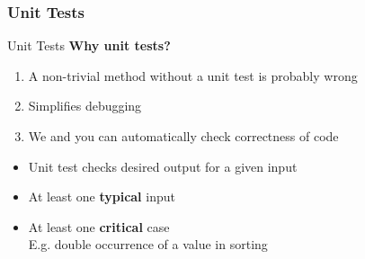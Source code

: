 \subsubsection{Unit Tests}
\begin{frame}{Unit Tests}
  \textbf{Why unit tests?}
  \begin{enumerate}
    \item
      A non-trivial method without a unit test is probably wrong
    \item<2- |handout:1>
      Simplifies debugging
    \item<3- |handout:1>
      We and you can automatically check correctness of code
  \end{enumerate}
  \vspace{1em}
  \begin{itemize}
    \item<5- |handout:1>
      Unit test checks desired output for a given input
    \item<6- |handout:1>
      At least one \textbf{typical} input
    \item<7- |handout:1>
      At least one \textbf{critical} case\\
      {\color{Hint}E.g. double occurrence of a value in sorting}
  \end{itemize}
\end{frame}



